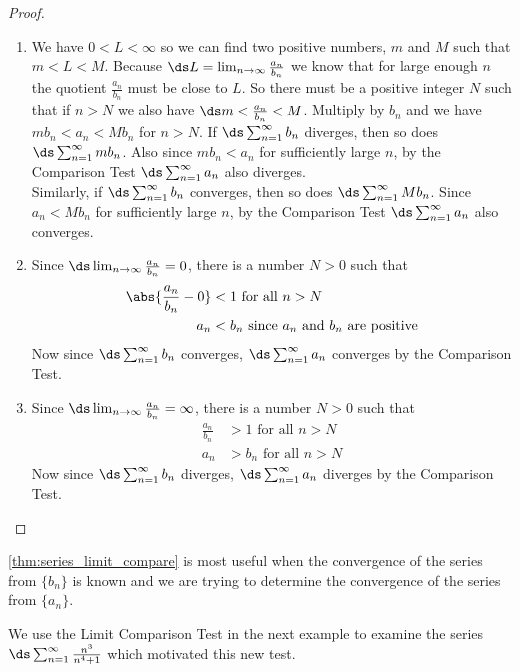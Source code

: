 \begin{proof}
\begin{enumerate}
\item We have $0<L<\infty$ so we can find two positive numbers, $m$ and $M$ such that $m<L<M$. Because $\ds L=\lim_{n\to\infty} \frac{a_n}{b_n}$ we know that for large enough $n$ the quotient $\frac{a_n}{b_n}$ must be close to $L$. So there must be a positive integer $N$ such that if $n>N$ we also have $\ds m<\frac{a_n}{b_n}<M$. Multiply by $b_n$ and we have $mb_n<a_n<Mb_n$ for $n>N$. If $\ds \sum_{n=1}^\infty b_n$ diverges, then so does $\ds \sum_{n=1}^\infty mb_n$. Also since $mb_n<a_n$ for sufficiently large $n$, by the Comparison Test $\ds \sum_{n=1}^\infty a_n$ also diverges. \\
Similarly, if $\ds \sum_{n=1}^\infty b_n$ converges, then so does $\ds \sum_{n=1}^\infty Mb_n$. Since $a_n<Mb_n$ for sufficiently large $n$, by the Comparison Test $\ds \sum_{n=1}^\infty a_n$ also converges.
\item Since $\ds \lim_{n\to\infty}\frac{a_n}{b_n}=0$, there is a number $N>0$ such that 
\begin{align*}
\abs{\frac{a_n}{b_n}-0}&<1\text{ for all }n>N \\
a_n&<b_n\text{ since }a_n\text{ and }b_n\text{ are positive}
\end{align*}
Now since $\ds \sum_{n=1}^\infty b_n$ converges, $\ds \sum_{n=1}^\infty a_n$ converges by the Comparison Test.
\item Since $\ds \lim_{n\to\infty}\frac{a_n}{b_n}=\infty$, there is a number $N>0$ such that 
\begin{align*}
\frac{a_n}{b_n}&>1\text{ for all }n>N \\
a_n&>b_n\text{ for all }n>N 
\end{align*}
Now since $\ds \sum_{n=1}^\infty b_n$ diverges, $\ds \sum_{n=1}^\infty a_n$ diverges by the Comparison Test.\qedhere
\end{enumerate}
\end{proof}


\autoref{thm:series_limit_compare} is most useful when the convergence of the series from $\{b_n\}$ is known and we are trying to determine the convergence of the series from $\{a_n\}$. 

We use the Limit Comparison Test in the next example to examine the series $\ds\sum_{n=1}^\infty \frac{n^3}{n^4+1}$ which motivated this new test.\\

